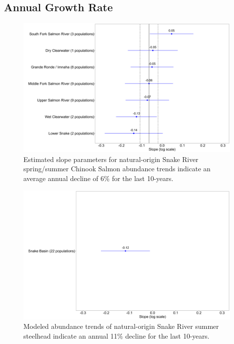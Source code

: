 \documentclass[10pt,a4paper]{article}
\begin{document}
\subsection{Annual Growth Rate}\label{annual-growth-rate-1}

\begin{figure}
\includegraphics[width=1\linewidth]{../figures/Chinook_salmon/Chinook_salmon_slope_2024} \caption{Estimated slope parameters for natural-origin Snake River spring/summer Chinook Salmon abundance trends indicate an average annual decline of 6\% for the last 10-years.}\label{fig:chn-sa-slope}
\end{figure}

\begin{figure}
\includegraphics[width=1\linewidth]{../figures/Steelhead/Steelhead_slope_2024} \caption{Modeled abundance trends of natural-origin Snake River summer steelhead indicate an annual 11\% decline for the last 10-years.}\label{fig:sth-sa-slope}
\end{figure}
\end{document}
